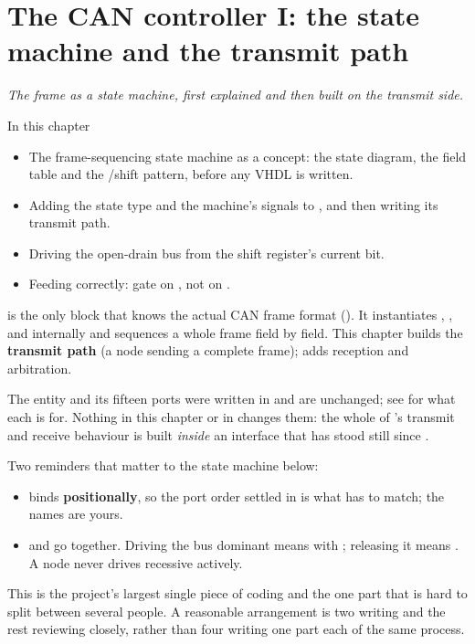 
\chapter{The CAN controller I: the state machine and the transmit path}
\label{c16:ch}

{\large\itshape The frame as a state machine, first explained and then built on the transmit
side.\par}

\begin{chapterbox}{In this chapter}
\begin{itemize}
  \item The frame-sequencing state machine as a concept: the state diagram, the field table and the
    /shift pattern, before any VHDL is written.
  \item Adding the state type and the machine's signals to , and then writing
    its transmit path.
  \item Driving the open-drain bus from the shift register's current bit.
  \item Feeding  correctly: gate on , not on .
\end{itemize}
\end{chapterbox}

 is the only block that knows the actual CAN frame format (). It
instantiates , ,  and  internally
and sequences a whole frame field by field. This chapter builds the \textbf{transmit path} (a node
sending a complete frame);  adds reception and arbitration.

The entity and its fifteen ports were written in  and are unchanged; see
 for what each is for. Nothing in this chapter or in 
changes them: the whole of 's transmit and receive behaviour is built
\emph{inside} an interface that has stood still since .

Two reminders that matter to the state machine below:
\begin{itemize}
  \item {} binds \textbf{positionally}, so the port order settled in
     is what has to match; the names are yours.
  \item {} and  go together. Driving the bus dominant means
     with ; releasing it means . A node
    never drives recessive actively.
\end{itemize}

This is the project's largest single piece of coding and the one part that is hard to split between
several people. A reasonable arrangement is two writing and the rest reviewing closely, rather than
four writing one part each of the same process.




